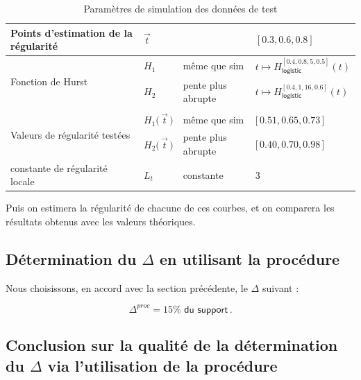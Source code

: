 \begin{table}[H]
\begin{tabularx}{\textwidth}{XXXX}
		\midrule
		Points d'estimation de la régularité                & $\vec t$                        &                    & $[0.3, 0.6, 0.8]$                                         \\
		\midrule
		\multirow{2}{\hsize}{Fonction de Hurst}             & $H_1$                           & même que sim       & $t \mapsto H^{[0.4, 0.8, 5, 0.5]}_{\textsf{logistic}}(t)$ \\
		                                                    & $H_2$                           & pente plus abrupte & $t \mapsto H^{[0.4, 1, 16, 0.6]}_{\textsf{logistic}}(t)$  \\
		\\
		\multirow{2}{\hsize}{Valeurs de régularité testées} & $H_1\bigl( \, \vec t \, \bigr)$ & même que sim       & $\bigl[ \, 0.51, 0.65, 0.73 \, \bigr]$                    \\
		                                                    & $H_2\bigl( \, \vec t \, \bigr)$ & pente plus abrupte & $\bigl[ \, 0.40, 0.70, 0.98 \, \bigr]$                    \\
		\midrule
		constante de régularité locale                      & $L_t$                           & constante          & 3                                                         \\
		\bottomrule
	\end{tabularx}
	\caption{Paramètres de simulation des données de test}
	\label{tab:sim_test_params}
\end{table}

\noindent Puis on estimera la régularité de chacune de ces courbes, et on comparera les résultats obtenus avec les valeurs théoriques.

\subsection[Détermination du delta en utilisant la procédure]{Détermination du $\Delta$ en utilisant la procédure}

Nous choisissons, en accord avec la section précédente, le $\Delta$ suivant :

\begin{equation*}
	\Delta^{proc} = 15\% \textsf{ du support} \,  .
\end{equation*}

\subsection[Conclusion sur la qualité de la détermination du delta via l'utilisation de la procédure]{Conclusion sur la qualité de la détermination du $\Delta$ via l'utilisation de la procédure}

